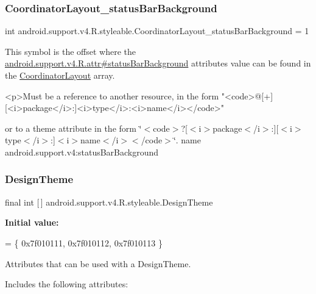 \subsubsection{\texorpdfstring{Coordinator\+Layout\+\_\+status\+Bar\+Background}{CoordinatorLayout\_statusBarBackground}}
{\footnotesize\ttfamily int android.\+support.\+v4.\+R.\+styleable.\+Coordinator\+Layout\+\_\+status\+Bar\+Background = 1\hspace{0.3cm}{\ttfamily [static]}}

This symbol is the offset where the \hyperlink{classandroid_1_1support_1_1v4_1_1R_1_1attr_a988668d48b62eb5d6612a421ffecbc58}{android.\+support.\+v4.\+R.\+attr\#status\+Bar\+Background} attribute\textquotesingle{}s value can be found in the \hyperlink{classandroid_1_1support_1_1v4_1_1R_1_1styleable_a94a213ce8a987dc40a09f872e7b309c5}{Coordinator\+Layout} array.

\begin{DoxyVerb}      <p>Must be a reference to another resource, in the form "<code>@[+][<i>package</i>:]<i>type</i>:<i>name</i></code>"
\end{DoxyVerb}
 or to a theme attribute in the form \char`\"{}$<$code$>$?\mbox{[}$<$i$>$package$<$/i$>$\+:\mbox{]}\mbox{[}$<$i$>$type$<$/i$>$\+:\mbox{]}$<$i$>$name$<$/i$>$$<$/code$>$\char`\"{}.  name android.\+support.\+v4\+:status\+Bar\+Background \mbox{\label{classandroid_1_1support_1_1v4_1_1R_1_1styleable_ac24c90108ad2b0d7b729f30efc3f8de9}} 
\subsubsection{\texorpdfstring{Design\+Theme}{DesignTheme}}
{\footnotesize\ttfamily final int \mbox{[}$\,$\mbox{]} android.\+support.\+v4.\+R.\+styleable.\+Design\+Theme\hspace{0.3cm}{\ttfamily [static]}}

{\bfseries Initial value\+:}
\begin{DoxyCode}
= \{
            0x7f010111, 0x7f010112, 0x7f010113
        \}
\end{DoxyCode}
Attributes that can be used with a Design\+Theme. 

Includes the following attributes\+:

